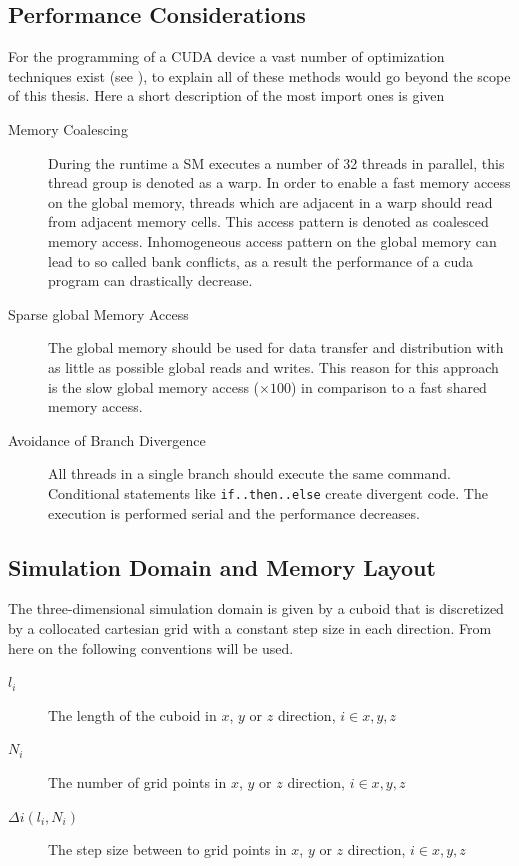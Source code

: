 \subsection{Performance Considerations}
\label{cuda:sec_performance}

For the programming of a CUDA device a vast number of optimization techniques exist (see \citep{CUDABP}),
to explain all of these methods would go beyond the scope of this thesis.
Here a short description of the most import ones is given

\begin{description}
    \item[Memory Coalescing]
        During the runtime a SM executes a number of 32 threads in parallel, this thread group is denoted as a warp.
        In order to enable a fast memory access on the global memory, threads which are adjacent in a warp should read from adjacent memory cells.
        This access pattern is denoted as coalesced memory access. Inhomogeneous access pattern on the global memory can lead to so called bank
        conflicts, as a result the performance of a cuda program can drastically decrease.

    \item[Sparse global Memory Access]
        The global memory should be used for data transfer and distribution with as little as possible global reads and writes.
        This reason for this approach is the slow global memory access ($\times 100$) in comparison to a fast shared memory access.

    \item[Avoidance of Branch Divergence] All threads in a single branch should execute the same command.
                              Conditional statements like \texttt{if..then..else} create divergent code.
                              The execution is performed serial and the performance decreases.
\end{description}


\subsection{Simulation Domain and  Memory Layout}

The three-dimensional simulation domain is given by a cuboid that is discretized by a
collocated cartesian grid with a constant step size in each direction.
From here on the following conventions will be used.

\begin{description}
    \item[$l_i$] The length of the cuboid in $x$, $y$ or $z$ direction, $i\in{x, y, z}$
    \item[$N_i$] The number of grid points in $x$, $y$ or $z$ direction, $i\in{x, y, z}$
    \item[$\Delta i(l_i, N_i)$] The step size between to grid points in $x$, $y$ or $z$ direction, $i\in{x, y, z}$
\end{description}

